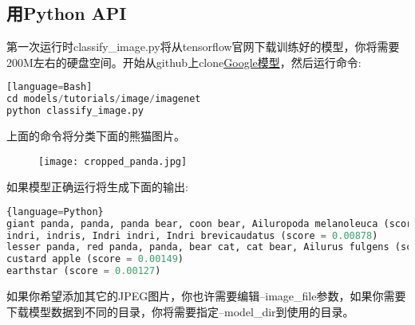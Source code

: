 \subsection{用Python API}
第一次运行时classify\_image.py将从tensorflow官网下载训练好的模型，你将需要200M左右的硬盘空间。开始从github上clone\href{https://github.com/tensorflow/models}{Google模型}，然后运行命令:
\begin{lstlisting}[language=Python][language=Bash]
cd models/tutorials/image/imagenet
python classify_image.py
\end{lstlisting}
上面的命令将分类下面的熊猫图片。
\begin{center}
\begin{figure}[H]
\centering
\texttt{[image: cropped\_panda.jpg]}
\end{figure}
\end{center}
如果模型正确运行将生成下面的输出:
\begin{lstlisting}[language=Python]{language=Python}
giant panda, panda, panda bear, coon bear, Ailuropoda melanoleuca (score = 0.88493)
indri, indris, Indri indri, Indri brevicaudatus (score = 0.00878)
lesser panda, red panda, panda, bear cat, cat bear, Ailurus fulgens (score = 0.00317)
custard apple (score = 0.00149)
earthstar (score = 0.00127)
\end{lstlisting}
如果你希望添加其它的JPEG图片，你也许需要编辑--image\_file参数，如果你需要下载模型数据到不同的目录，你将需要指定--model\_dir到使用的目录。
